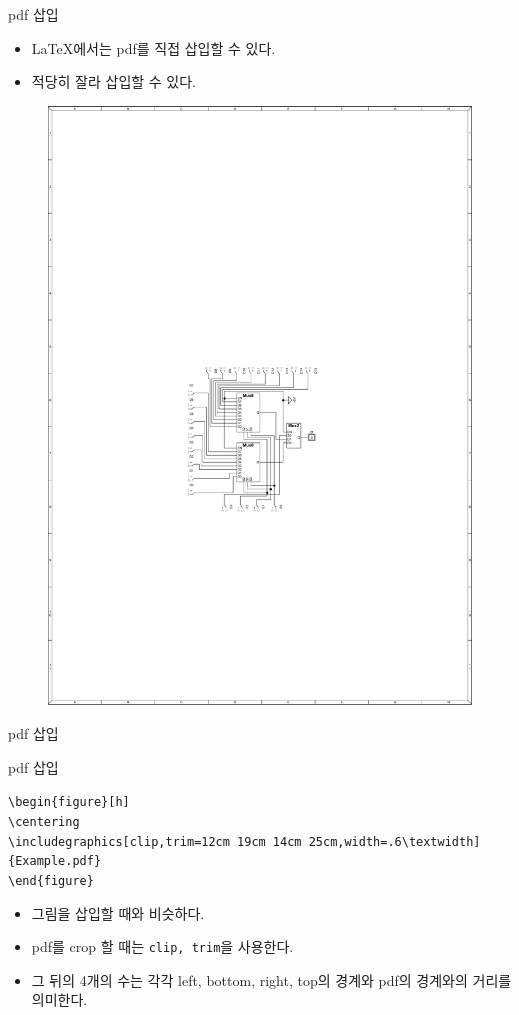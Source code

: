 \documentclass[12pt]{gshs_lecture}
\newcommand{\tb}{\textbackslash}
\newenvironment{codeblock}[1]{
	\begin{block}{#1}
		\setstretch{1.0}
		\begin{small}
}{
		\end{small}
	\end{block}
}
\begin{document}
\begin{frame}[t]{pdf 삽입}
	\begin{itemize}
		\item \LaTeX 에서는 pdf를 직접 삽입할 수 있다.
		\item 적당히 잘라 삽입할 수 있다.
	\end{itemize}
	
	\begin{figure}[h]
		\centering
		\includegraphics[clip,trim=12cm 19cm 14cm 25cm,width=.6\textwidth]{Example.pdf}
	\end{figure}
	
\end{frame}

\begin{frame}[t]{pdf 삽입}
	\begin{codeblock}{pdf 삽입}
		\texttt{\tb begin\{figure\}[h]\\
			\hspace{6mm} \tb centering\\
			\hspace{6mm} \tb includegraphics[clip,trim=12cm 19cm 14cm 25cm,width=.6\tb textwidth]\{Example.pdf\}\\
			\tb end\{figure\}}
	\end{codeblock}
	
	\begin{itemize}
		\item 그림을 삽입할 때와 비슷하다.
		\item pdf를 crop 할 때는 \texttt{clip, trim}을 사용한다.
		\item 그 뒤의 4개의 수는 각각 left, bottom, right, top의 경계와 pdf의 경계와의 거리를 의미한다.
	\end{itemize}
\end{frame}
\end{document}
